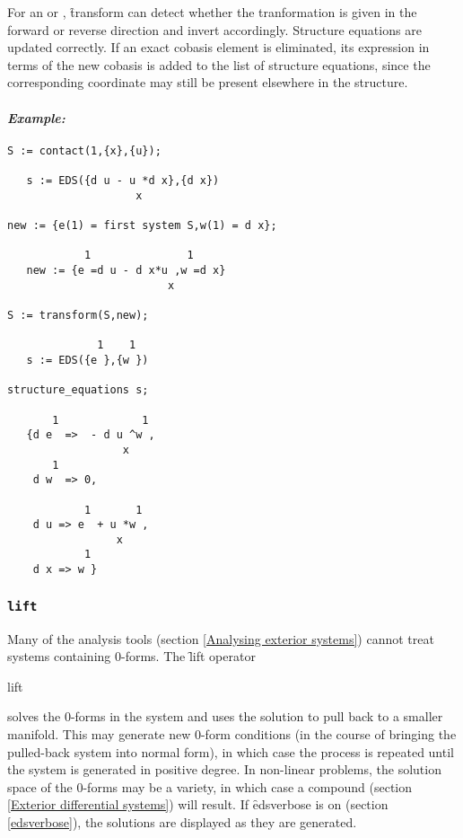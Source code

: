 For an  or , \f{transform} can detect whether the
tranformation is given in the forward or reverse direction and invert
accordingly. Structure equations are updated correctly. If an exact cobasis
element is eliminated, its expression in terms of the new cobasis is added
to the list of structure equations, since the corresponding coordinate may
still be present elsewhere in the structure.

\paragraph{\it Example:}
\begin{verbatim}
S := contact(1,{x},{u});

   s := EDS({d u - u *d x},{d x})
                    x

new := {e(1) = first system S,w(1) = d x};

            1               1
   new := {e =d u - d x*u ,w =d x}
                         x 

S := transform(S,new);

              1    1
   s := EDS({e },{w }) 

structure_equations s;

       1             1
   {d e  =>  - d u ^w ,
                  x 
       1
    d w  => 0, 

            1       1
    d u => e  + u *w ,
                 x 
            1
    d x => w }
\end{verbatim}

\subsubsection{\tt lift}
\label{lift}

Many of the analysis tools (section \ref{Analysing exterior systems})
cannot treat systems containing 0-forms. The \f{lift} operator
\begin{edssyntax}
	lift 
\end{edssyntax}
solves the 0-forms in the system and uses the solution to pull back to a
smaller manifold. This may generate new 0-form conditions (in the course of
bringing the pulled-back system into normal form), in which case the
process is repeated until the system is generated in positive degree. In
non-linear problems, the solution space of the 0-forms may be a variety, in
which case a compound  (section \ref{Exterior differential
systems}) will result. If \f{edsverbose} is on (section \ref{edsverbose}),
the solutions are displayed as they are generated.

